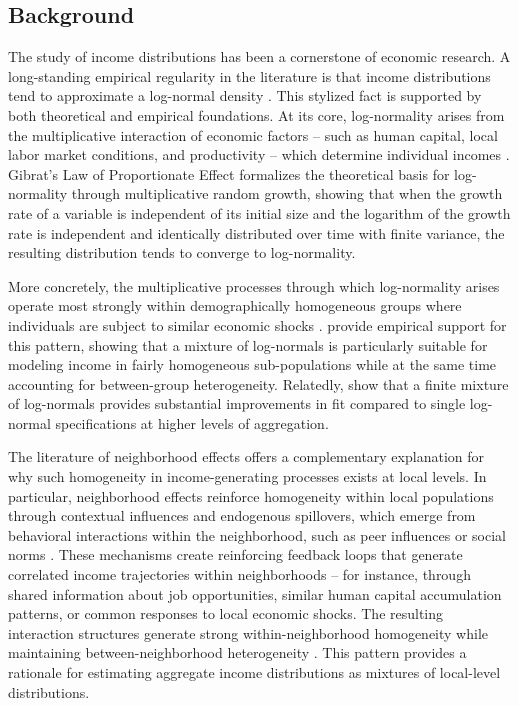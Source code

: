 
\subsection{Background}

The study of income distributions has been a cornerstone of economic research. A long-standing empirical regularity in the literature is that income distributions tend to approximate a log-normal density \citep{aitchison1957lognormal}. This stylized fact is supported by both theoretical and empirical foundations. At its core, log-normality arises from the multiplicative interaction of economic factors -- such as human capital, local labor market conditions, and productivity -- which determine individual incomes \citep{neal2000theories}. Gibrat's Law of Proportionate Effect \citep{gibrat1931inegalites} formalizes the theoretical basis for log-normality through multiplicative random growth, showing that when the growth rate of a variable is independent of its initial size and the logarithm of the growth rate is independent and identically distributed over time with finite variance, the resulting distribution tends to converge to log-normality. 


More concretely, the multiplicative processes through which log-normality arises operate most strongly within demographically homogeneous groups where individuals are subject to similar economic shocks \citep{aitchison1957lognormal, battistin2009consumption}. \citet{lubrano2016} provide empirical support for this pattern, showing that a mixture of log-normals is particularly suitable for modeling income in fairly homogeneous sub-populations while at the same time accounting for between-group heterogeneity. Relatedly, \citet{gardini2022} show that a finite mixture of log-normals provides substantial improvements in fit compared to single log-normal specifications at higher levels of aggregation.

The literature of neighborhood effects offers a complementary explanation for why such homogeneity in income-generating processes exists at local levels. In particular, neighborhood effects reinforce homogeneity within local populations through contextual influences and endogenous spillovers, which emerge from behavioral interactions within the neighborhood, such as peer influences or social norms \citep{manski1993identification, durlauf1996neighborhoods}. These mechanisms create reinforcing feedback loops that generate correlated income trajectories within neighborhoods -- for instance, through shared information about job opportunities, similar human capital accumulation patterns, or common responses to local economic shocks.  The resulting interaction structures generate strong within-neighborhood homogeneity while maintaining between-neighborhood heterogeneity \citep{durlauf2004neighborhood}. This pattern provides a rationale for estimating aggregate income distributions as mixtures of local-level distributions.

